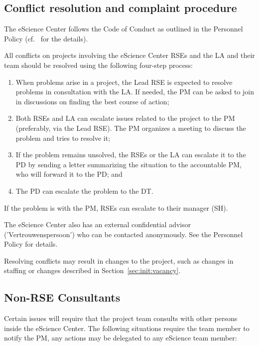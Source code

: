 \subsection{Conflict resolution and complaint procedure}
The eScience Center follows the Code of Conduct as outlined in the Personnel Policy (cf.~\cite{cao-intranet} for the details).

All conflicts on projects involving the eScience Center RSEs and the LA and their team should be resolved using the
following four-step process:

\begin{enumerate}
\item When problems arise in a project, the Lead RSE is expected to resolve problems in consultation with the LA. If needed,
the PM can be asked to join in discussions on finding the best course of action;
\item Both RSEs and LA can escalate issues related to the project to the PM (preferably, via the Lead RSE). The PM organizes a
meeting to discuss the problem and tries to resolve it;
\item If the problem remains unsolved, the RSEs or the LA can escalate it to the PD by sending a letter summarizing the
situation to the accountable PM, who will forward it to the PD; and
\item The PD can escalate the problem to the DT.
\end{enumerate}

If the problem is with the PM, RSEs can escalate to their manager (SH).

The eScience Center also has an external confidential advisor ('Vertrouwenspersoon') who can be contacted anonymously. See the Personnel
Policy for details.

Resolving conflicts may result in changes to the project, such as changes in staffing or changes described in Section~\ref{sec:init:vacancy}.

\subsection{Non-RSE Consultants}
\label{sec:exec:consult}
Certain issues will require that the project team consults with other persons inside the eScience Center. The following
situations require the team member to notify the PM, any actions may be delegated to any eScience team member:

